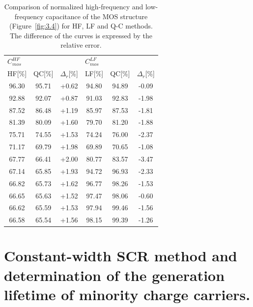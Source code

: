 \begin{table}[h!]\centering
  \begin{tabular}{c c c c c c}
    \multicolumn{3}{l}{$C^{HF}_{mos}$} & \multicolumn{3}{l}{$C^{LF}_{mos}$} \\
    HF[\%] & QC[\%] & $\Delta_r$[\%] & LF[\%] & QC[\%] & $\Delta_r$[\%] \\
    \hline
    96.30 & 95.71 & +0.62 & 94.80 & 94.89 & -0.09 \\
    92.88 & 92.07 & +0.87 & 91.03 & 92.83 & -1.98 \\
    87.52 & 86.48 & +1.19 & 85.97 & 87.53 & -1.81 \\
    81.39 & 80.09 & +1.60 & 79.70 & 81.20 & -1.88 \\
    75.71 & 74.55 & +1.53 & 74.24 & 76.00 & -2.37 \\
    71.17 & 69.79 & +1.98 & 69.89 & 70.65 & -1.08 \\
    67.77 & 66.41 & +2.00 & 80.77 & 83.57 & -3.47 \\
    67.14 & 65.85 & +1.93 & 94.72 & 96.93 & -2.33 \\
    66.82 & 65.73 & +1.62 & 96.77 & 98.26 & -1.53 \\
    66.65 & 65.63 & +1.52 & 97.47 & 98.06 & -0.60 \\
    66.62 & 65.59 & +1.53 & 97.94 & 99.46 & -1.56 \\
    66.58 & 65.54 & +1.56 & 98.15 & 99.39 & -1.26 \\
  \end{tabular}
  \caption[Comparison of normalized frequency and low-frequency
    capacitance of the MOS structure (Figure~\ref{fig:3.4}) for HF, LF
    and Q-C methods]{Comparison of normalized high-frequency and
    low-frequency capacitance of the MOS structure
    (Figure~\ref{fig:3.4}) for HF, LF and Q-C methods. The difference
    of the curves is expressed by the relative error.}\label{tab:3.2}
\end{table}

\section{Constant-width SCR method and determination of the generation lifetime of minority charge carriers.}\label{sec:3.4}

